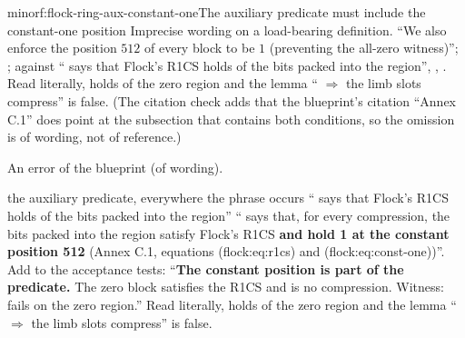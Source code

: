 \begin{finding}{minor}{f:flock-ring-aux-constant-one}{The auxiliary predicate must include the
constant-one position}
 Imprecise wording on a load-bearing definition.  \enquote{We
also enforce the position $512$ of every block to be $1$ (preventing the all-zero witness)};
; against  \enquote{ says that Flock's R1CS
holds of the bits packed into the  region}, ,
. Read literally,  holds of the zero region and
the lemma \enquote{ $⇒$ the limb slots compress} is false. (The citation check adds that
the blueprint's citation \enquote{Annex C.1} does point at the subsection that contains both
conditions, so the omission is of wording, not of reference.)

 An error of the blueprint (of wording).

\begin{change}{the auxiliary predicate, everywhere the phrase occurs}
\asis \enquote{ says that Flock's R1CS holds of the bits packed into the
 region}
\asproposed \enquote{ says that, for every compression, the bits packed into the
 region satisfy Flock's R1CS \textbf{and hold 1 at the constant position 512} (Annex
C.1, equations (flock:eq:r1cs) and (flock:eq:const-one))}. Add to the acceptance tests:
\enquote{\textbf{The constant position is part of the predicate.} The zero block satisfies the R1CS
and is no compression. Witness:  fails on the zero region.}
\reason Read literally,  holds of the zero region and the lemma \enquote{
$⇒$ the limb slots compress} is false.
\end{change}
\end{finding}

